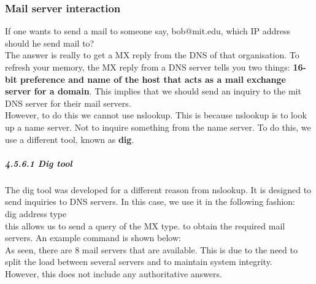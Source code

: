 \documentclass{article}
\begin{document}
\subsubsection{Mail server interaction}
If one wants to send a mail to someone say, bob@mit.edu, which IP address should he send mail to?\\
The answer is really to get a MX reply from the DNS of that organisation. To refresh your memory, the MX reply from a DNS server tells you two things: \textbf{16-bit preference and name of the host that acts as a mail exchange server for a domain}. This implies that we should send an inquiry to the mit DNS server for their mail servers.\\ 
However, to do this we cannot use nslookup. This is because nslookup is to look up a name server. Not to inquire something from the name server. To do this, we use a different tool, known as \textbf{dig}. 
\subparagraph{4.5.6.1 Dig tool\\} %
The dig tool was developed for a different reason from nslookup. It is designed to send inquiries to DNS servers. In this case, we use it in the following fashion:\\
dig {address} {type}\\
this allows us to send a query of the MX type. to obtain the required mail servers. An example command is shown below:\\
\noindent{}
As seen, there are 8 mail servers that are available. This is due to the need to split the load between several servers and to maintain system integrity.\\
However, this does not include any authoritative answers.\\
\end{document}

